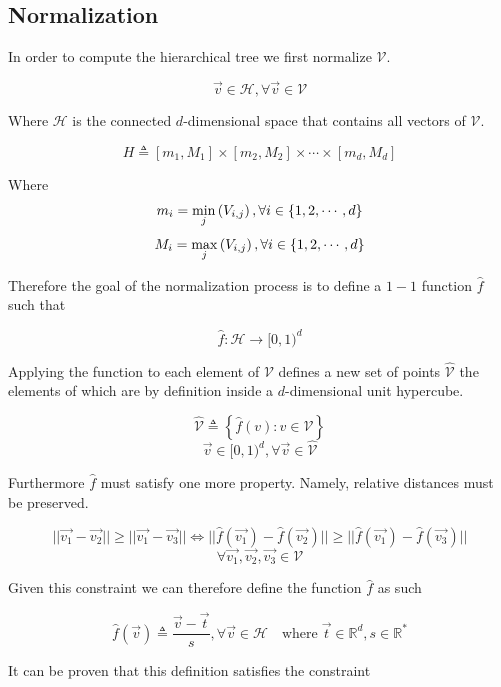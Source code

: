 \documentclass{juliacon}
\begin{document}
\subsection{Normalization}
In order to compute the hierarchical tree we first normalize $\mathcal{V}$.

$$ \vec{v} \in \mathcal{H}, \forall \vec{v} \in \mathcal{V}$$

Where $\mathcal{H}$ is the connected $d$-dimensional space that contains all vectors
of $\mathcal{V}$.

$$ H \triangleq [m_1, M_1] \times [m_2, M_2] \times \cdots \times [m_d, M_d] $$

Where
$$\space m_i = \min_j\left(V_{i,j}\right), \forall i \in \left\{1, 2, \cdots, d\right\}$$
$$\space M_i = \max_j\left(V_{i,j}\right), \forall i \in \left\{1, 2, \cdots, d\right\}$$

Therefore the goal of the normalization process is to define a $1-1$ function $\hat{f}$
such that

$$\hat{f}: \mathcal{H} \rightarrow [0, 1)^d$$

Applying the function to each element of $\mathcal{V}$ defines a new set of points
$\hat{\mathcal{V}}$ the elements of which are by definition inside a $d$-dimensional unit
hypercube.

$$ \hat{\mathcal{V}} \triangleq \left\{ \hat{f}\left(v\right) : v \in \mathcal{V} \right\}  $$
$$ \vec{v} \in [0, 1)^d, \forall \vec{v} \in \hat{\mathcal{V}} $$

Furthermore $\hat{f}$ must satisfy one more property. Namely, relative distances
must be preserved.

$$ ||\vec{v_1} - \vec{v_2}|| \geq ||\vec{v_1} - \vec{v_3}|| \Leftrightarrow ||\hat{f}(\vec{v_1}) - \hat{f}(\vec{v_2})|| \geq ||\hat{f}(\vec{v_1}) - \hat{f}(\vec{v_3})||$$
$$ \forall \vec{v_1}, \vec{v_2}, \vec{v_3} \in \mathcal{V} $$

Given this constraint we can therefore define the function $\hat{f}$ as such
\begin{definition}
  $$\hat{f}(\vec{v}) \triangleq \frac{\vec{v} - \vec{t}}{s}, \forall \vec{v} \in \mathcal{H} \quad \textrm{where}\; \vec{t} \in \mathbb{R}^d, s\in\mathbb{R}^*$$
\end{definition}

It can be proven that this definition satisfies the constraint
\end{document}
